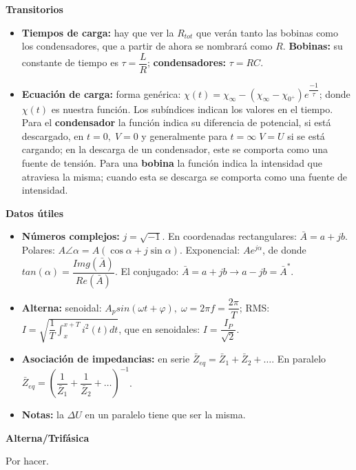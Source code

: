 \documentclass[a4paper, twocolumn, 10pt]{article}
\begin{document}
\Large\textbf{Transitorios} \normalsize

\begin{itemize}
	\item \textbf{Tiempos de carga:} hay que ver la $R_{tot}$ que verán tanto las bobinas como los condensadores, que a partir de ahora se nombrará como $R$. \textbf{Bobinas:} su constante de tiempo es $\tau = \dfrac{L}{R}$; \textbf{condensadores:} $\tau = RC$.
	\item \textbf{Ecuación de carga:} forma genérica: $\chi(t) = \chi_\infty - (\chi_\infty - \chi_{0^+})e^{\dfrac{-1}{\tau}}$; donde $\chi(t)$ es nuestra función. Los subíndices indican los valores en el tiempo. Para el \textbf{condensador} la función indica su diferencia de potencial, si está descargado, en $t = 0, \; V=0$ y generalmente para $t = \infty\; V=U$ si se está cargando; en la descarga de un condensador, este se comporta como una fuente de tensión. Para una \textbf{bobina} la función indica la intensidad que atraviesa la misma; cuando esta se descarga se comporta como una fuente de intensidad.
\end{itemize}

\Large\textbf{Datos útiles} \normalsize

\begin{itemize}
	\item \textbf{Números complejos:} $j = \sqrt{-1}$. En coordenadas rectangulares: $\bar{A} = a + jb$. Polares: $A\angle\alpha = A(\cos\alpha +j\sin\alpha)$. Exponencial: $Ae^{j\alpha}$, de donde $tan(\alpha) = \dfrac{Img(\bar{A})}{Re(\bar{A})}$. El conjugado: $\bar{A} = a + jb \rightarrow a - jb = \bar{A}^*$.
	\item \textbf{Alterna:} senoidal: $A_psin(\omega t + \varphi), \; \omega = 2\pi f = \dfrac{2\pi}{T}$; RMS: $I = \sqrt{\dfrac{1}{T}\displaystyle\int_{x}^{x + T} i^2(t) dt}$, que en senoidales: $I = \dfrac{I_P}{\sqrt{2}}$.
	\item \textbf{Asociación de impedancias:} en serie $\bar{Z}_{eq} = \bar{Z}_1 +\bar{Z}_2 + \ldots$. En paralelo $\bar{Z}_{eq} = \left(\dfrac{1}{\bar{Z}_1} + \dfrac{1}{\bar{Z}_2}+ \ldots\right)^{-1}$.
	\item \textbf{Notas:} la $\Delta U$ en un paralelo tiene que ser la misma.
\end{itemize}

\Large\textbf{Alterna/Trifásica} \normalsize

Por hacer.
\end{document}
